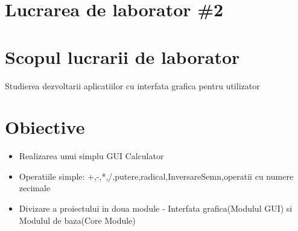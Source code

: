 \section*{Lucrarea de laborator \#2}

\section{Scopul lucrarii de laborator}
Studierea dezvoltarii aplicatiilor cu interfata grafica pentru utilizator
\section{Obiective}

\begin{itemize}
	\item Realizarea unui simplu GUI Calculator
	\item Operatiile simple: +,-,*,/,putere,radical,InversareSemn,operatii cu numere zecimale
	\item Divizare a proiectului in doua module - Interfata grafica(Modulul GUI) si Modulul de baza(Core Module)
\end{itemize}

\clearpage